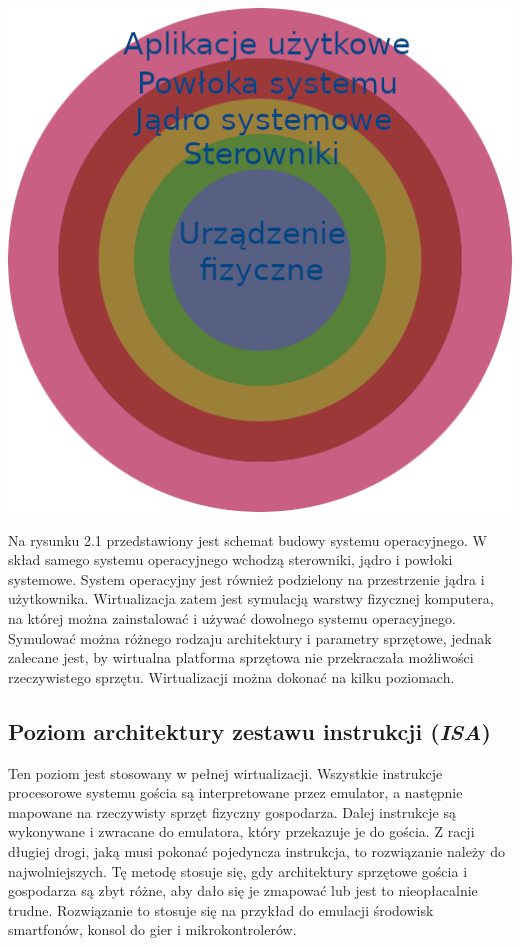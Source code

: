 \documentclass[polish, a4paper, 12pt, oneside]{book}
\begin{document}
	\begin{center}
		\includegraphics[width=160mm]{schemat_os.png}
	\end{center}
	
	Na rysunku 2.1 przedstawiony jest schemat budowy systemu operacyjnego. W skład samego systemu operacyjnego wchodzą sterowniki, jądro i powłoki systemowe. System operacyjny jest również podzielony na przestrzenie jądra i użytkownika. Wirtualizacja zatem jest symulacją warstwy fizycznej komputera, na której można zainstalować i używać dowolnego systemu operacyjnego. Symulować można różnego rodzaju architektury i parametry sprzętowe, jednak zalecane jest, by wirtualna platforma sprzętowa nie przekraczała możliwości rzeczywistego sprzętu. Wirtualizacji można dokonać na kilku poziomach.
	\subsection {Poziom architektury zestawu instrukcji (\textit{ISA})}
	Ten poziom jest stosowany w pełnej wirtualizacji. Wszystkie instrukcje procesorowe systemu gościa są interpretowane przez emulator, a następnie mapowane na rzeczywisty sprzęt fizyczny gospodarza. Dalej instrukcje są wykonywane i zwracane do emulatora, który przekazuje je do gościa. Z racji długiej drogi, jaką musi pokonać pojedyncza instrukcja, to rozwiązanie należy do najwolniejszych. Tę metodę stosuje się, gdy architektury sprzętowe gościa i gospodarza są zbyt różne, aby dało się je zmapować lub jest to nieopłacalnie trudne. Rozwiązanie to stosuje się na przykład do emulacji środowisk smartfonów, konsol do gier i mikrokontrolerów.
\end{document}
